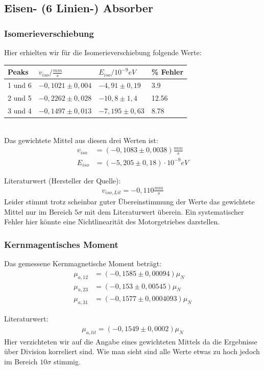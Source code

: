 \documentclass[12pt]{article}
\begin{document}
\subsection*{Eisen- (6 Linien-) Absorber}
\subsubsection*{Isomerieverschiebung}
Hier erhielten wir für die Isomerieverschiebung folgende Werte: \\

\begin{tabular}{|l|lll|}
\hline
Peaks & $v_{iso}/\frac{mm}{s}$ & $E_{iso}/10^{-9}eV$ & \% Fehler\\
\hline
1 und 6& $-0,1021 \pm 0,004$ & $-4,91 \pm 0,19$ & 3.9\\
2 und 5& $-0,2262 \pm 0,028$ & $-10,8 \pm 1,4$ & 12.56\\
3 und 4& $-0,1497 \pm 0,013$ & $-7,195 \pm 0,63$ & 8.78\\
\hline
\end{tabular} \\

Das gewichtete Mittel aus diesen drei Werten ist:
\begin{align*}
  v_{iso} &= ( -0,1083 \pm 0,0038) \frac{mm}{s} \\
 E_{iso} &= ( -5,205 \pm 0,18 ) \cdot 10^{-9} eV
\end{align*}

Literaturwert (Hersteller der Quelle):
\begin{align*}
 v_{iso,Lit} = -0,110 \frac{mm}{s}
\end{align*}
Leider stimmt trotz scheinbar guter Übereinstimmung der Werte das gewichtete Mittel nur im Bereich $5\sigma$ mit dem Literaturwert überein. Ein systematischer Fehler hier könnte eine Nichtlinearität des Motorgetriebes darstellen.

\subsubsection*{Kernmagentisches Moment}
Das gemessene Kernmagnetische Moment beträgt:
\begin{align}
\mu_{a,12} &=  (-0,1585 \pm 0,00094) \mu_N \\
\mu_{a,23} &=  (-0,153 \pm 0,00545) \mu_N \\
\mu_{a,31} &=  (-0,1577 \pm 0,0004093) \mu_N 
\end{align}

Literaturwert:
\begin{align*}
\mu_{a,lit} = (-0,1549 \pm 0,0002) \mu_N
\end{align*}
Hier verzichteten wir auf die Angabe eines gewichteten Mittels da die Ergebnisse über Division korreliert sind. Wie man sieht sind alle Werte etwas zu hoch
jedoch im Bereich $10\sigma$ stimmig.
\end{document}
